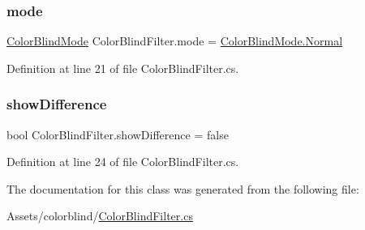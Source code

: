 \subsubsection{\texorpdfstring{mode}{mode}}
{\footnotesize\ttfamily \mbox{\hyperlink{_color_blind_filter_8cs_a7e15f9c8e49d31776ea0e5d0b0480d1f}{Color\+Blind\+Mode}} Color\+Blind\+Filter.\+mode = \mbox{\hyperlink{_color_blind_filter_8cs_a7e15f9c8e49d31776ea0e5d0b0480d1fa960b44c579bc2f6818d2daaf9e4c16f0}{Color\+Blind\+Mode.\+Normal}}}



Definition at line 21 of file Color\+Blind\+Filter.\+cs.

\mbox{\label{class_color_blind_filter_a2c4497e97ebf12ccf2cd94382737826b}} 
\subsubsection{\texorpdfstring{show\+Difference}{showDifference}}
{\footnotesize\ttfamily bool Color\+Blind\+Filter.\+show\+Difference = false}



Definition at line 24 of file Color\+Blind\+Filter.\+cs.



The documentation for this class was generated from the following file\+:\begin{DoxyCompactItemize}
\item 
Assets/colorblind/\mbox{\hyperlink{_color_blind_filter_8cs}{Color\+Blind\+Filter.\+cs}}\end{DoxyCompactItemize}
